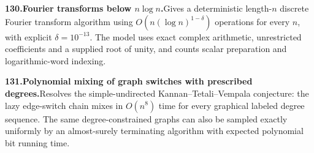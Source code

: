 \documentclass[11pt,a4paper]{article}
\begin{document}
  \par \begin{minipage}{\linewidth}
  \fontsize{10.5}{12.6}\selectfont\RaggedRight
  \hypertarget{result 130}{}
  {\bfseries\textcolor{muted}{130.}\enspace Fourier transforms below $n\log n$.}\enspace Gives a deterministic length-$n$ discrete Fourier transform algorithm using $O(n(\log n)^{1-\delta})$ operations for every $n$, with explicit $\delta=10^{-13}$. The model uses exact complex arithmetic, unrestricted coefficients and a supplied root of unity, and counts scalar preparation and logarithmic-word indexing.\par
  \end{minipage}\par\vspace{5pt}



  \par \begin{minipage}{\linewidth}
  \fontsize{10.5}{12.6}\selectfont\RaggedRight
  \hypertarget{result 131}{}
  {\bfseries\textcolor{muted}{131.}\enspace Polynomial mixing of graph switches with prescribed degrees.}\enspace Resolves the simple-undirected Kannan--Tetali--Vempala conjecture: the lazy edge-switch chain mixes in $O(n^8)$ time for every graphical labeled degree sequence. The same degree-constrained graphs can also be sampled exactly uniformly by an almost-surely terminating algorithm with expected polynomial bit running time.\par
  \end{minipage}\par\vspace{5pt}
\end{document}
